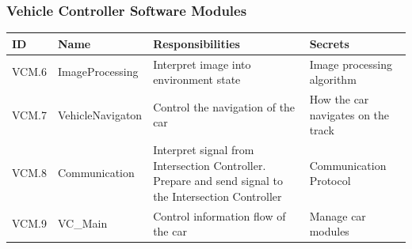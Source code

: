 \documentclass [10pt]{article}
\begin{document}
\subsubsection{Vehicle Controller Software Modules}

\begin{longtable}{ |p{ }  | p{ } |  p{ } |  p{ } |}  \hline
    
    \textbf{ID} & \textbf{Name} &  \textbf{Responsibilities} & \textbf{Secrets} \\ \hline
    
    \cellcolor{tableCell}VCM.6  &\cellcolor{tableCell}ImageProcessing &\cellcolor{tableCell}Interpret image into environment state &\cellcolor{tableCell}Image processing algorithm  \\ \hline
    
    VCM.7 & VehicleNavigaton & Control the navigation of the car & How the car navigates on the track \\ \hline
    
    \cellcolor{tableCell}VCM.8  & \cellcolor{tableCell}Communication & \cellcolor{tableCell}Interpret signal from Intersection Controller. Prepare and send signal to the Intersection Controller & \cellcolor{tableCell}Communication Protocol \\ \hline

    VCM.9 & VC\_Main & Control information flow of the car & Manage car modules \\ \hline
    
\end{longtable}

\end{document}
